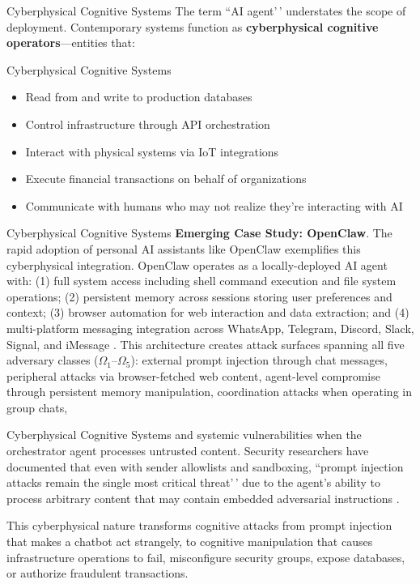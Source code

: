 \documentclass[
  ignorenonframetext,
]{beamer}
\begin{document}
\begin{frame}[allowframebreaks]{Cyberphysical Cognitive Systems}
\protect{}\label{cyberphysical-cognitive-systems}
The term ``AI agent'\,' understates the scope of deployment.
Contemporary systems function as
\textbf{cyberphysical cognitive operators}---entities that:

\end{frame}

\begin{frame}[allowframebreaks]{Cyberphysical Cognitive Systems}
\begin{itemize}
\item Read from and write to production databases
\item Control infrastructure through API orchestration
\item Interact with physical systems via IoT integrations
\item Execute financial transactions on behalf of organizations
\item Communicate with humans who may not realize they're interacting with AI
\end{itemize}

\end{frame}

\begin{frame}[allowframebreaks]{Cyberphysical Cognitive Systems}
\textbf{Emerging Case Study: OpenClaw}. The rapid adoption of personal
AI assistants like OpenClaw \cite{openclaw2026} exemplifies this
cyberphysical integration. OpenClaw operates as a locally-deployed AI
agent with: (1) full system access including shell command execution and
file system operations; (2) persistent memory across sessions storing
user preferences and context; (3) browser automation for web interaction
and data extraction; and (4) multi-platform messaging integration across
WhatsApp, Telegram, Discord, Slack, Signal, and iMessage
\cite{openclaw2026security}. This architecture creates attack surfaces
spanning all five adversary classes (\(\Omega_1\)--\(\Omega_5\)):
external prompt injection through chat messages, peripheral attacks via
browser-fetched web content, agent-level compromise through persistent
memory manipulation, coordination attacks when operating in group chats,
\end{frame}

\begin{frame}[allowframebreaks]{Cyberphysical Cognitive Systems}
and systemic vulnerabilities when the orchestrator agent processes
untrusted content. Security researchers have documented that even with
sender allowlists and sandboxing, ``prompt injection attacks remain the
single most critical threat'\,' due to the agent's ability to process
arbitrary content that may contain embedded adversarial instructions
\cite{openclaw2026security, echoleak2025}.

This cyberphysical nature transforms cognitive attacks from prompt
injection that makes a chatbot act strangely, to cognitive manipulation
that causes infrastructure operations to fail, misconfigure security
groups, expose databases, or authorize fraudulent transactions.

\end{frame}
\end{document}
